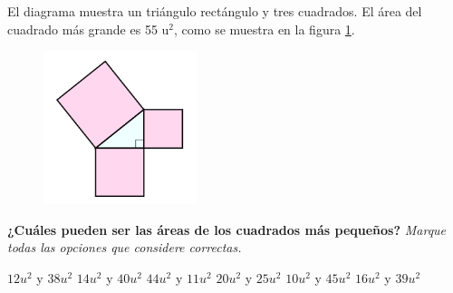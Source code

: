 El diagrama muestra un triángulo rectángulo y tres cuadrados.
El área del cuadrado más grande es 55 u$^2$, como se muestra en la figura \ref{fig:area11}.

\begin{multicols}{2}
    \begin{figure}[H]
        \centering
        \includegraphics[width=0.4\textwidth]{../images/area11.png}
        \caption{}
        \label{fig:area11}
    \end{figure}

    \columnbreak

    \textbf{¿Cuáles pueden ser las áreas de los cuadrados más pequeños?}
    \emph{Marque todas las opciones que considere correctas.}
    \begin{checkboxes}
        \choice $12u^2$ y $38u^2$
        \choice $14u^2$ y $40u^2$
        \CorrectChoice $44u^2$ y $11u^2$
        \choice $20u^2$ y $25u^2$
        \CorrectChoice $10u^2$ y $45u^2$
        \CorrectChoice $16u^2$ y $39u^2$
    \end{checkboxes}
\end{multicols}
